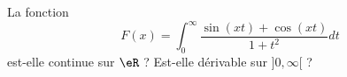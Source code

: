 

\begin{exercice}\label{exo_I-3-9}

La fonction
\begin{equation}
	F(x)=\int_0^{\infty}\frac{ \sin(xt)+\cos(xt) }{ 1+t^2 }dt
\end{equation}
est-elle continue sur $\eR$ ? Est-elle dérivable sur $]0,\infty[$ ?

\end{exercice}
